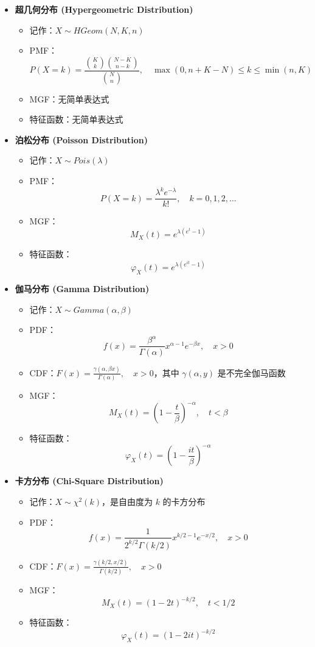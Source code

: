 \begin{itemize}
    \item \textbf{超几何分布 (Hypergeometric Distribution)}
    \begin{itemize}
        \item 记作：$X \sim HGeom(N, K, n)$
        \item PMF：$$P(X = k) = \frac{\binom{K}{k} \binom{N-K}{n-k}}{\binom{N}{n}}, \quad \max(0, n+K-N) \leq k \leq \min(n, K)$$
        \item MGF：无简单表达式
        \item 特征函数：无简单表达式
    \end{itemize}

    \item \textbf{泊松分布 (Poisson Distribution)}
    \begin{itemize}
        \item 记作：$X \sim Pois(\lambda)$
        \item PMF：$$P(X = k) = \frac{\lambda^k e^{-\lambda}}{k!}, \quad k = 0, 1, 2, \ldots$$
        \item MGF：$$M_X(t) = e^{\lambda(e^t-1)}$$
        \item 特征函数：$$\varphi_X(t) = e^{\lambda(e^{it}-1)}$$
    \end{itemize}

    \item \textbf{伽马分布 (Gamma Distribution)}
    \begin{itemize}
        \item 记作：$X \sim Gamma(\alpha, \beta)$
        \item PDF：$$f(x) = \frac{\beta^\alpha}{\Gamma(\alpha)} x^{\alpha-1} e^{-\beta x}, \quad x > 0$$
        \item CDF：$F(x) = \frac{\gamma(\alpha, \beta x)}{\Gamma(\alpha)}, \quad x > 0$，其中 $\gamma(\alpha, y)$ 是不完全伽马函数
        \item MGF：$$M_X(t) = \left(1-\frac{t}{\beta}\right)^{-\alpha}, \quad t < \beta$$
        \item 特征函数：$$\varphi_X(t) = \left(1-\frac{it}{\beta}\right)^{-\alpha}$$
    \end{itemize}

    \item \textbf{卡方分布 (Chi-Square Distribution)}
    \begin{itemize}
        \item 记作：$X \sim \chi^2(k)$，是自由度为 $k$ 的卡方分布
        \item PDF：$$f(x) = \frac{1}{2^{k/2}\Gamma(k/2)} x^{k/2-1} e^{-x/2}, \quad x > 0$$
        \item CDF：$F(x) = \frac{\gamma(k/2, x/2)}{\Gamma(k/2)}, \quad x > 0$
        \item MGF：$$M_X(t) = (1-2t)^{-k/2}, \quad t < 1/2$$
        \item 特征函数：$$\varphi_X(t) = (1-2it)^{-k/2}$$
    \end{itemize}


\end{itemize}
